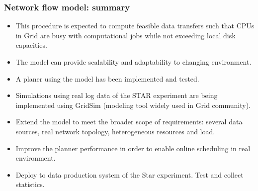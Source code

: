 \documentclass{beamer}
\begin{document}
\begin{frame}\frametitle{Network flow model: summary}
\begin{small}
\begin{block}{}
\begin{itemize}
\item This procedure is expected to compute feasible data transfers such that
CPUs in Grid are busy with computational jobs while not exceeding local disk capacities.
\item The model can provide scalability and adaptability to changing environment.
\item A planer using the model has been implemented and tested.
\item Simulations using real log data of the STAR experiment are being implemented using GridSim (modeling tool widely used in Grid community).   
\item Extend the model to meet the broader scope of requirements: several data sources, real network topology, heterogeneous resources and load.  
\item Improve the planner performance in order to enable online scheduling in real environment. 
\item Deploy to data production system of the Star experiment. Test and collect statistics.
\end{itemize}
\end{block}
\end{small}
\end{frame}
\end{document}
